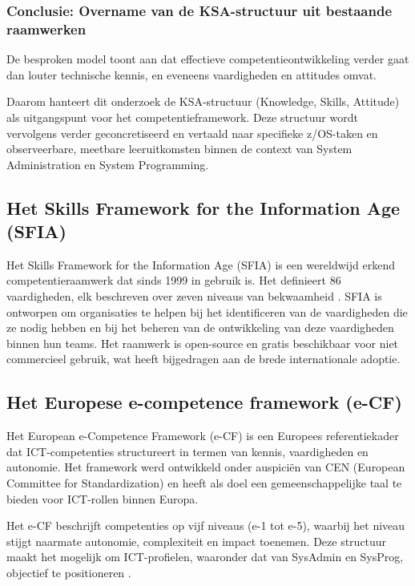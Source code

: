 \subsubsection{Conclusie: Overname van de KSA-structuur uit bestaande raamwerken}

De besproken model toont aan dat effectieve competentieontwikkeling verder gaat dan louter technische kennis, en eveneens vaardigheden en attitudes omvat.

Daarom hanteert dit onderzoek de KSA-structuur (Knowledge, Skills, Attitude) als uitgangspunt voor het competentieframework. Deze structuur wordt vervolgens verder geconcretiseerd en vertaald naar specifieke z/OS-taken en observeerbare, meetbare leeruitkomsten binnen de context van System Administration en System Programming.

\subsection{Het Skills Framework for the Information Age (SFIA)}
\label{sec:sfia-framework}
Het Skills Framework for the Information Age (SFIA) is een wereldwijd erkend competentieraamwerk dat sinds 1999 in gebruik is. Het definieert 86 vaardigheden, elk beschreven over zeven niveaus van bekwaamheid \autocite{sfia_framework}.
SFIA is ontworpen om organisaties te helpen bij het identificeren van de vaardigheden die ze nodig hebben en bij het beheren van de ontwikkeling van deze vaardigheden binnen hun teams. 
Het raamwerk is open-source en gratis beschikbaar voor niet commercieel gebruik, wat heeft bijgedragen aan de brede internationale adoptie.

\subsection{Het Europese e-competence framework (e-CF)}
\label{sec:e-cf-framework-sa}
Het European e-Competence Framework (e-CF) \autocite{eCF_framework} is een Europees referentiekader dat ICT-competenties structureert in termen van kennis, vaardigheden en autonomie. Het framework werd ontwikkeld onder auspiciën van CEN (European Committee for Standardization) en heeft als doel een gemeenschappelijke taal te bieden voor ICT-rollen binnen Europa.

Het e-CF beschrijft competenties op vijf niveaus (e-1 tot e-5), waarbij het niveau stijgt naarmate autonomie, complexiteit en impact toenemen. Deze structuur maakt het mogelijk om ICT-profielen, waaronder dat van SysAdmin en SysProg, objectief te positioneren \autocite{eCF_framework}.

